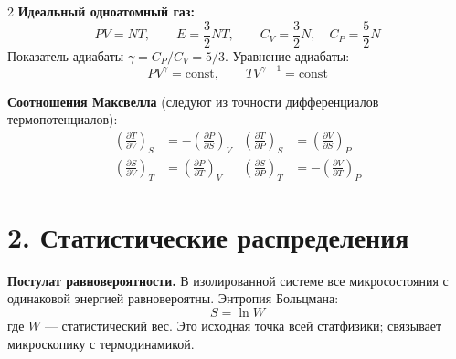 \documentclass[a4paper,10pt]{article}
\begin{document}
\begin{multicols}{2}
\smallskip
\textbf{Идеальный одноатомный газ:}
\begin{equation*}
    PV = NT, \qquad E = \frac{3}{2}NT, \qquad C_V = \frac{3}{2}N,\quad C_P = \frac{5}{2}N
\end{equation*}
Показатель адиабаты $\gamma = C_P/C_V = 5/3$. Уравнение адиабаты:
\begin{equation*}
    PV^\gamma = \text{const}, \qquad TV^{\gamma-1} = \text{const}
\end{equation*}

\textbf{Соотношения Максвелла} (следуют из точности дифференциалов термопотенциалов):
\begin{align*}
    \left(\frac{\partial T}{\partial V}\right)_{\!S} &= -\left(\frac{\partial P}{\partial S}\right)_{\!V}
    & \left(\frac{\partial T}{\partial P}\right)_{\!S} &= \left(\frac{\partial V}{\partial S}\right)_{\!P} \\[2pt]
    \left(\frac{\partial S}{\partial V}\right)_{\!T} &= \left(\frac{\partial P}{\partial T}\right)_{\!V}
    & \left(\frac{\partial S}{\partial P}\right)_{\!T} &= -\left(\frac{\partial V}{\partial T}\right)_{\!P}
\end{align*}

\section*{2. Статистические распределения}

\textbf{Постулат равновероятности.} В изолированной системе все микросостояния с одинаковой энергией равновероятны. Энтропия Больцмана:
\begin{equation*}
    S = \ln W
\end{equation*}
где $W$ --- статистический вес. Это исходная точка всей статфизики; связывает микроскопику с термодинамикой.


\end{multicols}
\end{document}
